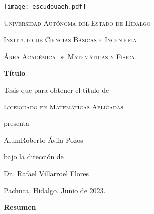 \documentclass[12pt]{book}
\theoremstyle{definition}
\newcounter{in}
\newcommand{\elespacio}{1.4cm}
\begin{document}
\mainmatter 
\begin{titlepage}
  \begin{center}
    \null
    \vspace*{\fill}

    \texttt{[image: escudouaeh.pdf]}

    \vspace*{\elespacio}

    \textsc{Universidad Autónoma del Estado de Hidalgo}

    \textsc{Instituto de Ciencias Básicas e Ingeniería}

    \textsc{Área Académica de Matemáticas y Física}

    \vspace*{\elespacio}

    {\Huge\bfseries Título\par}

    \vspace*{\elespacio}

    {\large Tesis que para obtener el título de}

    \vspace*{\elespacio}

    {\Large\textsc{Licenciado en Matemáticas Aplicadas}}

    \vspace*{\elespacio}

    {\large presenta}

    \vspace*{\elespacio}

    {\Huge AlumRoberto Ávila-Pozos}

    \vspace*{\elespacio}

    {\large bajo la dirección de}

    \bigskip

    {\Large Dr.~Rafael Villarroel Flores}

    \bigskip

    {Pachuca, Hidalgo. Junio de 2023.}

    \vspace*{\fill}

  \end{center}
\end{titlepage}

\thispagestyle{empty}
\begin{flushleft}
  {\bfseries\Large Resumen}
\end{flushleft}
\end{document}
